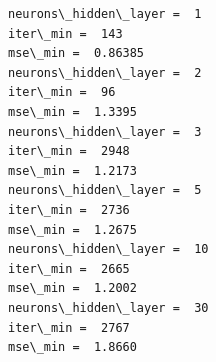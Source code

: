 \documentclass[11pt]{article}
\begin{document}
    \begin{Verbatim}[commandchars=\\\{\}]
neurons\_hidden\_layer =  1
iter\_min =  143
mse\_min =  0.86385
neurons\_hidden\_layer =  2
iter\_min =  96
mse\_min =  1.3395
neurons\_hidden\_layer =  3
iter\_min =  2948
mse\_min =  1.2173
neurons\_hidden\_layer =  5
iter\_min =  2736
mse\_min =  1.2675
neurons\_hidden\_layer =  10
iter\_min =  2665
mse\_min =  1.2002
neurons\_hidden\_layer =  30
iter\_min =  2767
mse\_min =  1.8660

    \end{Verbatim}

    \begin{center}
    \end{center}
    { \hspace*{\fill} \\}
    
    \begin{center}
    \end{center}
    { \hspace*{\fill} \\}
    
    \begin{center}
    \end{center}
    { \hspace*{\fill} \\}
    
    \begin{center}
    \end{center}
    { \hspace*{\fill} \\}
    
    \begin{center}
    \end{center}
    { \hspace*{\fill} \\}
    
    \begin{center}
    \end{center}
    { \hspace*{\fill} \\}
    

    
    
    
    
\end{document}
